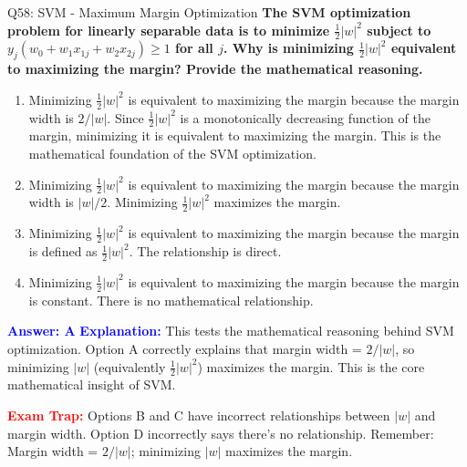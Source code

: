 \documentclass[8pt]{beamer}
\begin{document}
	\begin{frame}{Q58: SVM - Maximum Margin Optimization}
		\fontsize{6.5}{7.5}\selectfont
		\textbf{The SVM optimization problem for linearly separable data is to minimize $\frac{1}{2}|w|^2$ subject to $y_j(w_0 + w_1 x_{1j} + w_2 x_{2j}) \geq 1$ for all $j$. Why is minimizing $\frac{1}{2}|w|^2$ equivalent to maximizing the margin? Provide the mathematical reasoning.}
		
		\begin{enumerate}
			\item Minimizing $\frac{1}{2}|w|^2$ is equivalent to maximizing the margin because the margin width is $2/|w|$. Since $\frac{1}{2}|w|^2$ is a monotonically decreasing function of the margin, minimizing it is equivalent to maximizing the margin. This is the mathematical foundation of the SVM optimization.
			\item Minimizing $\frac{1}{2}|w|^2$ is equivalent to maximizing the margin because the margin width is $|w|/2$. Minimizing $\frac{1}{2}|w|^2$ maximizes the margin.
			\item Minimizing $\frac{1}{2}|w|^2$ is equivalent to maximizing the margin because the margin is defined as $\frac{1}{2}|w|^2$. The relationship is direct.
			\item Minimizing $\frac{1}{2}|w|^2$ is equivalent to maximizing the margin because the margin is constant. There is no mathematical relationship.
		\end{enumerate}
		
		\vspace{0.1cm}
		\textcolor{blue}{\textbf{Answer: A}}
		\vspace{0.1cm}
		\textcolor{blue}{\textbf{Explanation:}} This tests the mathematical reasoning behind SVM optimization. Option A correctly explains that margin width = $2/|w|$, so minimizing $|w|$ (equivalently $\frac{1}{2}|w|^2$) maximizes the margin. This is the core mathematical insight of SVM.
		
		\textcolor{red}{\textbf{Exam Trap:}} Options B and C have incorrect relationships between $|w|$ and margin width. Option D incorrectly says there's no relationship. Remember: Margin width = $2/|w|$; minimizing $|w|$ maximizes the margin.
	\end{frame}
	
\end{document}
